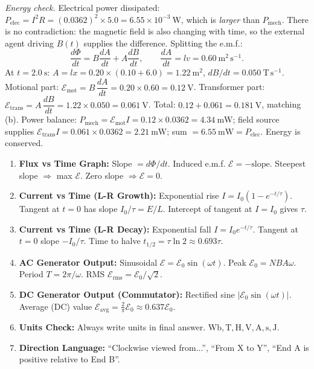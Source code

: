 \documentclass[11pt]{article}
\begin{document}
\begin{exoresolu}
\textit{Energy check.} Electrical power dissipated: $P_{\text{elec}} = I^2 R = (0.0362)^2 \times 5.0 = 6.55 \times 10^{-3}\ \mathrm{W}$, which is \emph{larger} than $P_{\text{mech}}$. There is no contradiction: the magnetic field is also changing with time, so the external agent driving $B(t)$ supplies the difference. Splitting the e.m.f.:
\[
\frac{d\Phi}{dt} = B\frac{dA}{dt} + A\frac{dB}{dt}, \qquad \frac{dA}{dt} = lv = 0.60\ \mathrm{m^2\,s^{-1}}.
\]
At $t=2.0\ \mathrm{s}$: $A = lx = 0.20 \times (0.10 + 6.0) = 1.22\ \mathrm{m^2}$, $dB/dt = 0.050\ \mathrm{T\,s^{-1}}$.
Motional part: $\mathcal{E}_{\text{mot}} = B\,\dfrac{dA}{dt} = 0.20 \times 0.60 = 0.12\ \mathrm{V}$.
Transformer part: $\mathcal{E}_{\text{trans}} = A\,\dfrac{dB}{dt} = 1.22 \times 0.050 = 0.061\ \mathrm{V}$.
Total: $0.12 + 0.061 = 0.181\ \mathrm{V}$, matching (b).
Power balance: $P_{\text{mech}} = \mathcal{E}_{\text{mot}} I = 0.12 \times 0.0362 = 4.34\ \mathrm{mW}$; field source supplies $\mathcal{E}_{\text{trans}} I = 0.061 \times 0.0362 = 2.21\ \mathrm{mW}$; sum $= 6.55\ \mathrm{mW} = P_{\text{elec}}$. Energy is conserved.
\end{exoresolu}

\begin{methode}
\begin{enumerate}
\item \textbf{Flux vs Time Graph:} Slope $= d\Phi/dt$. Induced e.m.f. $\mathcal{E} = - \text{slope}$. Steepest slope $\Rightarrow$ max $\mathcal{E}$. Zero slope $\Rightarrow \mathcal{E}=0$.
\item \textbf{Current vs Time (L-R Growth):} Exponential rise $I = I_0(1-e^{-t/\tau})$. Tangent at $t=0$ has slope $I_0/\tau = E/L$. Intercept of tangent at $I=I_0$ gives $\tau$.
\item \textbf{Current vs Time (L-R Decay):} Exponential fall $I = I_0 e^{-t/\tau}$. Tangent at $t=0$ slope $-I_0/\tau$. Time to halve $t_{1/2} = \tau \ln 2 \approx 0.693\tau$.
\item \textbf{AC Generator Output:} Sinusoidal $\mathcal{E} = \mathcal{E}_0 \sin(\omega t)$. Peak $\mathcal{E}_0 = NBA\omega$. Period $T = 2\pi/\omega$. RMS $\mathcal{E}_{\text{rms}} = \mathcal{E}_0/\sqrt{2}$.
\item \textbf{DC Generator Output (Commutator):} Rectified sine $|\mathcal{E}_0 \sin(\omega t)|$. Average (DC) value $\mathcal{E}_{\text{avg}} = \frac{2}{\pi}\mathcal{E}_0 \approx 0.637\mathcal{E}_0$.
\item \textbf{Units Check:} Always write units in final answer. $\mathrm{Wb}, \mathrm{T}, \mathrm{H}, \mathrm{V}, \mathrm{A}, \mathrm{s}, \mathrm{J}$.
\item \textbf{Direction Language:} ``Clockwise viewed from...'', ``From X to Y'', ``End A is positive relative to End B''.
\end{enumerate}
\end{methode}
\end{document}
